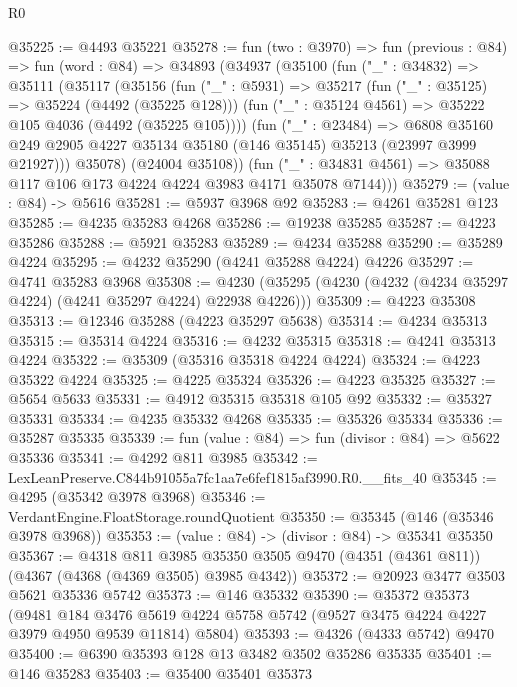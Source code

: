 \begin{lexlean}{R0}
\begin{coremodule}
@35225 := @4493 @35221
@35278 := fun (two : @3970) =>
  fun (previous : @84) =>
  fun (word : @84) =>
  @34893
    (@34937
      (@35100
        (fun ("_" : @34832) =>
        @35111
          (@35117
            (@35156
              (fun ("_" : @5931) =>
              @35217
                (fun ("_" : @35125) => @35224 (@4492 (@35225 @128)))
                (fun ("_" : @35124 @4561) => @35222 @105 @4036 (@4492 (@35225 @105))))
              (fun ("_" : @23484) =>
              @6808
                @35160
                @249
                @2905
                @4227
                @35134
                @35180
                (@146 @35145)
                @35213
                (@23997 @3999 @21927)))
            @35078)
          (@24004 @35108))
        (fun ("_" : @34831 @4561) => @35088 @117 @106 @173 @4224 @4224 @3983 @4171 @35078 @7144)))
@35279 := (value : @84) -> @5616
@35281 := @5937 @3968 @92
@35283 := @4261 @35281 @123
@35285 := @4235 @35283 @4268
@35286 := @19238 @35285
@35287 := @4223 @35286
@35288 := @5921 @35283
@35289 := @4234 @35288
@35290 := @35289 @4224
@35295 := @4232 @35290 (@4241 @35288 @4224) @4226
@35297 := @4741 @35283 @3968
@35308 := @4230 (@35295 (@4230 (@4232 (@4234 @35297 @4224) (@4241 @35297 @4224) @22938 @4226)))
@35309 := @4223 @35308
@35313 := @12346 @35288 (@4223 @35297 @5638)
@35314 := @4234 @35313
@35315 := @35314 @4224
@35316 := @4232 @35315
@35318 := @4241 @35313 @4224
@35322 := @35309 (@35316 @35318 @4224 @4224)
@35324 := @4223 @35322 @4224
@35325 := @4225 @35324
@35326 := @4223 @35325
@35327 := @5654 @5633
@35331 := @4912 @35315 @35318 @105 @92
@35332 := @35327 @35331
@35334 := @4235 @35332 @4268
@35335 := @35326 @35334
@35336 := @35287 @35335
@35339 := fun (value : @84) => fun (divisor : @84) => @5622 @35336
@35341 := @4292 @811 @3985
@35342 := LexLeanPreserve.C844b91055a7fc1aa7e6fef1815af3990.R0.__fits_40
@35345 := @4295 (@35342 @3978 @3968)
@35346 := VerdantEngine.FloatStorage.roundQuotient
@35350 := @35345 (@146 (@35346 @3978 @3968))
@35353 := (value : @84) -> (divisor : @84) -> @35341 @35350
@35367 := @4318
    @811
    @3985
    @35350
    @3505
    @9470
    (@4351 (@4361 @811))
    (@4367 (@4368 (@4369 @3505) @3985 @4342))
@35372 := @20923 @3477 @3503 @5621 @35336 @5742
@35373 := @146 @35332
@35390 := @35372
    @35373
    (@9481
      @184
      @3476
      @5619
      @4224
      @5758
      @5742
      (@9527 @3475 @4224 @4227 @3979 @4950 @9539 @11814)
      @5804)
@35393 := @4326 (@4333 @5742) @9470
@35400 := @6390 @35393 @128 @13 @3482 @3502 @35286 @35335
@35401 := @146 @35283
@35403 := @35400 @35401 @35373

\end{coremodule}
\end{lexlean}
